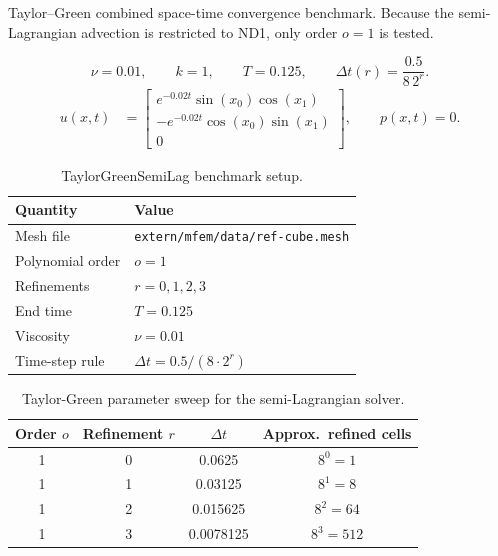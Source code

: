 \documentclass[11pt]{article}
\begin{document}
Taylor--Green combined space-time convergence benchmark.  Because the
semi-Lagrangian advection is restricted to ND1, only order $o=1$ is tested.

\[
	\nu=0.01,\qquad k=1,\qquad T=0.125,\qquad
	\Delta t(r)=\frac{0.5}{8\,2^{r}}.
\]
\begin{align}
	u(x,t)
	 & =\begin{bmatrix}
		    e^{-0.02t}\sin(x_0)\cos(x_1)  \\
		    -e^{-0.02t}\cos(x_0)\sin(x_1) \\
		    0
	    \end{bmatrix},
	\qquad
	p(x,t)=0.
\end{align}

\begin{table}[H]
	\centering
	\begin{tabularx}{\textwidth}{@{}lX@{}}
		\toprule
		Quantity         & Value                                   \\
		\midrule
		Mesh file        & \texttt{extern/mfem/data/ref-cube.mesh} \\
		Polynomial order & $o=1$                                   \\
		Refinements      & $r=0,1,2,3$                             \\
		End time         & $T=0.125$                               \\
		Viscosity        & $\nu = 0.01$                            \\
		Time-step rule   & $\Delta t = 0.5 / (8\cdot 2^{r})$       \\
		\bottomrule
	\end{tabularx}
	\caption{TaylorGreenSemiLag benchmark setup.}
\end{table}

\begin{table}[H]
	\centering
	\begin{tabular}{@{}cccc@{}}
		\toprule
		Order $o$ & Refinement $r$ & $\Delta t$ & Approx.\ refined cells \\
		\midrule
		1         & 0              & 0.0625     & $8^0 = 1$              \\
		1         & 1              & 0.03125    & $8^1 = 8$              \\
		1         & 2              & 0.015625   & $8^2 = 64$             \\
		1         & 3              & 0.0078125  & $8^3 = 512$            \\
		\bottomrule
	\end{tabular}
	\caption{Taylor-Green parameter sweep for the semi-Lagrangian solver.}
\end{table}
\end{document}
